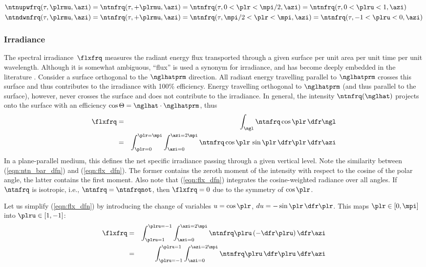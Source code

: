 \documentclass[12pt]{article}
\begin{document}
\begin{subequations}
\begin{align}
\label{eqn:ntn_hms_upw}
\ntnupwfrq(\tau,\plrmu,\azi) & = \ntnfrq(\tau,+\plrmu,\azi) 
= \ntnfrq(\tau,0 < \plr < \mpi/2,\azi) = \ntnfrq(\tau,0 < \plru <
1,\azi) \\
\label{eqn:ntn_hms_dwn}
\ntndwnfrq(\tau,\plrmu,\azi) & = \ntnfrq(\tau,+\plrmu,\azi) 
= \ntnfrq(\tau,\mpi/2 < \plr < \mpi,\azi) = \ntnfrq(\tau,-1 < \plru <
0,\azi) 
\end{align}
\end{subequations} 

\subsubsection[Irradiance]{Irradiance}\label{sxn:flx}
The spectral irradiance~$\flxfrq$ measures the radiant energy flux
transported through a given surface per unit area per unit time per
unit wavelength. 
Although it is somewhat ambiguous, ``flux'' is used a synonym for
irradiance, and has become deeply embedded in the literature
\cite[]{Mad87}.  
Consider a surface orthogonal to the $\nglhatprm$ direction.
All radiant energy travelling parallel to $\nglhatprm$ crosses this
surface and thus contributes to the irradiance with 100\% efficiency.
Energy travelling orthogonal to $\nglhatprm$ (and thus parallel to the
surface), however, never crosses the surface and does not contribute
to the irradiance.
In general, the intensity $\ntnfrq(\nglhat)$ projects onto the surface
with an efficiency $\cos \Theta = \nglhat \cdot \nglhatprm$, thus
\begin{eqnarray}
\flxfrq & = & \int_{\ngl} \ntnfrq \cos \plr \,\dfr\ngl \nonumber \\
& = & \int_{\plr=0}^{\plr=\mpi} \int_{\azi=0}^{\azi=2\mpi} 
\ntnfrq \cos \plr \, \sin \plr \,\dfr\plr \,\dfr\azi 
\label{eqn:flx_dfn}
\end{eqnarray}
In a plane-parallel medium, this defines the net specific irradiance
passing through a given vertical level. 
Note the similarity between (\ref{eqn:ntn_bar_dfn}) and
(\ref{eqn:flx_dfn}).  
The former contains the zeroth moment of the intensity with respect to
the cosine of the polar angle, the latter contains the first moment.
Also note that (\ref{eqn:flx_dfn}) integrates the cosine-weighted
radiance over all angles.
If $\ntnfrq$ is isotropic, i.e., $\ntnfrq = \ntnfrqnot$, then $\flxfrq
= 0$ due to the symmetry of $\cos \plr$. 

Let us simplify (\ref{eqn:flx_dfn}) by introducing the change of
variables $u =\cos \plr$, $du = -\sin \plr \,\dfr\plr$.
This maps $\plr \in [0, \mpi]$ into $\plru \in [1, -1]$: 
\begin{eqnarray}
\flxfrq & = & \int_{\plru=1}^{\plru=-1} \int_{\azi=0}^{\azi=2\mpi} 
\ntnfrq \plru \, (- \dfr\plru) \,\dfr\azi \nonumber \\
& = & \int_{\plru=-1}^{\plru=1} \int_{\azi=0}^{\azi=2\mpi} 
\ntnfrq \plru \,\dfr\plru \,\dfr\azi
\label{eqn:flx_udfn}
\end{eqnarray}
\end{document}
